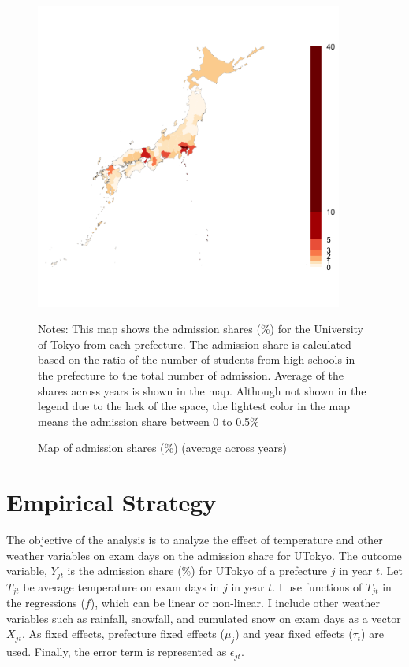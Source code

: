 \documentclass[12pt,letterpaper]{article}
\begin{document}
\begin{figure}[H]
  \centering
  \caption{Map of admission shares (\%) (average across years)}
  \includegraphics[width = 0.9\textwidth]{../Output/images/admission_map.png}
  \label{fig:admission_map}
  \footnotesize
  \begin{tablenotes}
    \item Notes:
      This map shows the admission shares (\%) for the University of Tokyo from each prefecture.
      The admission share is calculated based on the ratio of the number of students from high schools in the prefecture to the total number of admission.
      Average of the shares across years is shown in the map.
      Although not shown in the legend due to the lack of the space, the lightest color in the map means the admission share between 0 to 0.5\% 
  \end{tablenotes}
\end{figure}

\section{Empirical Strategy}

The objective of the analysis is to analyze the effect of temperature and other weather variables on exam days on the admission share for UTokyo.
The outcome variable, $Y_{jt}$ is the admission share (\%) for UTokyo of a prefecture $j$ in year $t$.
Let $T_{jt}$ be average temperature on exam days in $j$ in year $t$.
I use functions of $T_{jt}$ in the regressions ($f$), which can be linear or non-linear.
I include other weather variables such as rainfall, snowfall, and cumulated snow on exam days as a vector $X_{jt}$.
As fixed effects, prefecture fixed effects ($\mu_j$) and year fixed effects ($\tau_t$) are used.
Finally, the error term is represented as $\epsilon_{jt}$.
\end{document}
